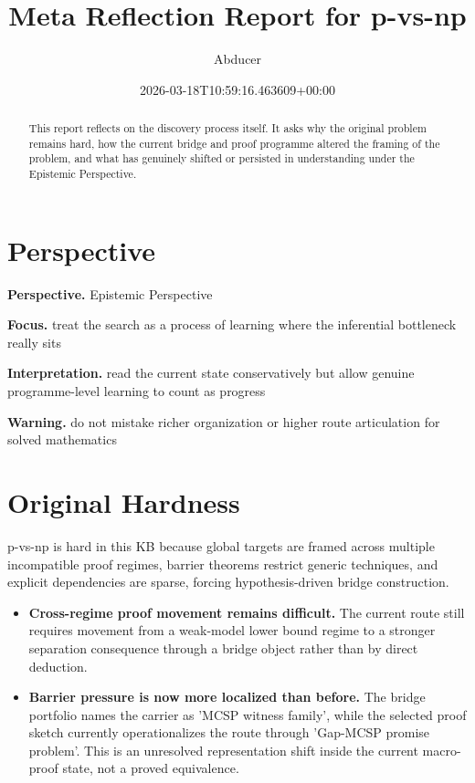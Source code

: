 \documentclass[11pt]{article}
\title{Meta Reflection Report for p-vs-np}
\author{Abducer}
\date{2026-03-18T10:59:16.463609+00:00}
\begin{document}
\maketitle

\begin{abstract}
This report reflects on the discovery process itself. It asks why the original problem remains hard, how the current bridge and proof programme altered the framing of the problem, and what has genuinely shifted or persisted in understanding under the Epistemic Perspective.
\end{abstract}

\section{Perspective}
\textbf{Perspective.} Epistemic Perspective

\textbf{Focus.} treat the search as a process of learning where the inferential bottleneck really sits

\textbf{Interpretation.} read the current state conservatively but allow genuine programme-level learning to count as progress

\textbf{Warning.} do not mistake richer organization or higher route articulation for solved mathematics

\section{Original Hardness}
p-vs-np is hard in this KB because global targets are framed across multiple incompatible proof regimes, barrier theorems restrict generic techniques, and explicit dependencies are sparse, forcing hypothesis-driven bridge construction.

\begin{itemize}[leftmargin=1.5em]
\item \textbf{Cross-regime proof movement remains difficult.} The current route still requires movement from a weak-model lower bound regime to a stronger separation consequence through a bridge object rather than by direct deduction.
\item \textbf{Barrier pressure is now more localized than before.} The bridge portfolio names the carrier as 'MCSP witness family', while the selected proof sketch currently operationalizes the route through 'Gap-MCSP promise problem'. This is an unresolved representation shift inside the current macro-proof state, not a proved equivalence.
\end{itemize}
\end{document}
